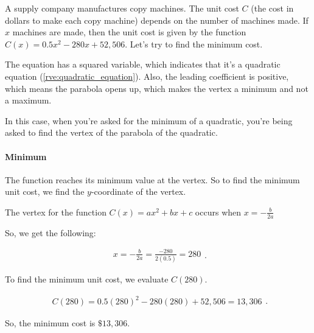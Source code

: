 
A supply company manufactures copy machines. The unit cost $C$ (the cost in
dollars to make each copy machine) depends on the number of machines made. If
$x$ machines are made, then the unit cost is given by the function
$C(x) = 0.5x^{2} - 280x + 52,506$. Let's try to find the minimum cost.

\begin{note}
  \label{nte:quadratic_notice}

  The equation has a squared variable, which indicates that it's a quadratic
  equation (\ref{rve:quadratic_equation}). Also, the leading coefficient is
  positive, which means the parabola opens up, which makes the vertex a minimum
  and not a maximum.

  \begin{figure}[H]
    \centering
    \label{fig:minimum_maximum_of_quadratic}
  \end{figure}

  In this case, when you're asked for the minimum of a quadratic, you're being
  asked to find the vertex of the parabola of the quadratic.
\end{note}

\paragraph{Minimum}
\label{par:minimum}

The function reaches its minimum value at the vertex.
So to find the minimum unit cost, we find the $y$-coordinate of the vertex.

The vertex for the function $C(x) = ax^{2} + bx + c$ occurs when
$x = -\frac{b}{2a}$

So, we get the following:

\begin{equation}
  \label{eqt:the_following}
  \begin{split}
    x = -\frac{b}{2a} = \frac{-280}{2(0.5)} = 280
  \end{split}
.\end{equation}

To find the minimum unit cost, we evaluate $C(280)$.

\begin{equation}
  \label{eqt:evaluate_c_of_x}
  \begin{split}
    C(280) = 0.5(280)^{2} - 280(280) + 52,506 = 13,306
  \end{split}
.\end{equation}

So, the minimum cost is $\$13,306$.


